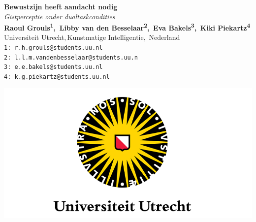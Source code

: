 \documentclass[a0,portrait]{a0poster}
\begin{document}


\begin{minipage}[b]{0.75\linewidth}
\VeryHuge \color{NavyBlue} \textbf{Bewustzijn heeft aandacht nodig} \color{Black}\\ %
\Huge\textit{Gistperceptie onder dualtaskcondities}\\[2.4cm] %
\huge \textbf{Raoul Grouls\textsuperscript{1},
	\,Libby van den Besselaar\textsuperscript{2},
	\,Eva Bakels\textsuperscript{3},
	\,Kiki Piekartz\textsuperscript{4}}\\[0.5cm] %
\huge Universiteit Utrecht,\,Kunstmatige Intelligentie,\, Nederland\\[0.4cm] %
\normalsize \texttt{1: r.h.grouls@students.uu.nl}\\
\texttt{2: l.l.m.vandenbesselaar@students.uu.n}\\
\texttt{3: e.e.bakels@students.uu.nl}\\
\texttt{4: k.g.piekartz@students.uu.nl}\\
\end{minipage}
%
\begin{minipage}[b]{0.3\linewidth}
\includegraphics[width=20cm]{uu-logo.png}\\ 
\end{minipage}
\end{document}
